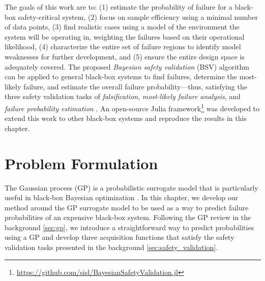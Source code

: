 The goals of this work are to: 
(1) estimate the probability of failure for a black-box safety-critical system,
(2) focus on sample efficiency using a minimal number of data points,
(3) find realistic cases using a model of the environment the system will be operating in, weighting the failures based on their operational likelihood,
(4) characterize the entire set of failure regions to identify model weaknesses for further development, and
(5) ensure the entire design space is adequately covered.
The proposed \textit{Bayesian safety validation} (BSV) algorithm can be applied to general black-box systems to find failures, determine the most-likely failure, and estimate the overall failure probability---thus, satisfying the three safety validation tasks of \textit{falsification}, \textit{most-likely failure analysis}, and \textit{failure probability estimation} \cite{corso2021survey}.
An open-source Julia framework\footnote{\url{https://github.com/sisl/BayesianSafetyValidation.jl}} was developed to extend this work to other black-box systems and reproduce the results in this chapter.


\section{Problem Formulation}\label{sec:problem}
The Gaussian process (GP) is a probabilistic surrogate model that is particularly useful in black-box Bayesian optimization \cite{williams2006gaussian,optbook}.
In this chapter, we develop our method around the GP surrogate model to be used as a way to predict failure probabilities of an expensive black-box system.
Following the GP review in the background \cref{sec:gp}, we introduce a straightforward way to predict probabilities using a GP and develop three acquisition functions that satisfy the safety validation tasks presented in the background \cref{sec:safety_validation}.


